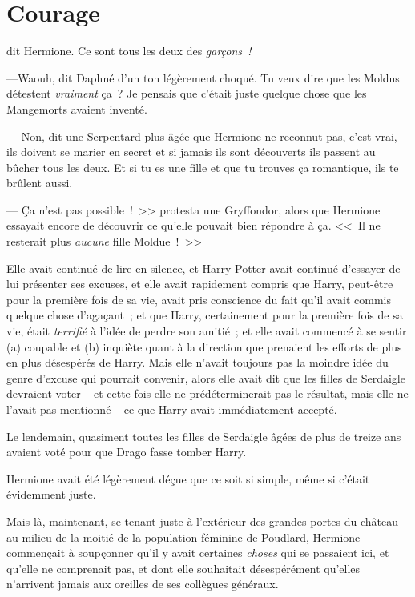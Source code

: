 \chapter{Courage}

 dit Hermione. Ce sont tous les deux des \emph{garçons~!}

\hplettrineextrapara
---Waouh, dit Daphné d'un ton légèrement choqué. Tu veux dire que les Moldus détestent \emph{vraiment} ça~? Je pensais que c'était juste quelque chose que les Mangemorts avaient inventé.

--- Non, dit une Serpentard plus âgée que Hermione ne reconnut pas, c'est vrai, ils doivent se marier en secret et si jamais ils sont découverts ils passent au bûcher tous les deux. Et si tu es une fille et que tu trouves ça romantique, ils te brûlent aussi.

--- Ça n'est pas possible~!~>> protesta une Gryffondor, alors que Hermione essayait encore de découvrir ce qu'elle pouvait bien répondre à ça. <<~Il ne resterait plus \emph{aucune} fille Moldue~!~>>

Elle avait continué de lire en silence, et Harry Potter avait continué d'essayer de lui présenter ses excuses, et elle avait rapidement compris que Harry, peut-être pour la première fois de sa vie, avait pris conscience du fait qu'il avait commis quelque chose d'agaçant~; et que Harry, certainement pour la première fois de sa vie, était \emph{terrifié} à l'idée de perdre son amitié~; et elle avait commencé à se sentir (a) coupable et (b) inquiète quant à la direction que prenaient les efforts de plus en plus désespérés de Harry. Mais elle n'avait toujours pas la moindre idée du genre d'excuse qui pourrait convenir, alors elle avait dit que les filles de Serdaigle devraient voter -- et cette fois elle ne prédéterminerait pas le résultat, mais elle ne l'avait pas mentionné -- ce que Harry avait immédiatement accepté.

Le lendemain, quasiment toutes les filles de Serdaigle âgées de plus de treize ans avaient voté pour que Drago fasse tomber Harry.

Hermione avait été légèrement déçue que ce soit si simple, même si c'était évidemment juste.

Mais là, maintenant, se tenant juste à l'extérieur des grandes portes du château au milieu de la moitié de la population féminine de Poudlard, Hermione commençait à soupçonner qu'il y avait certaines \emph{choses} qui se passaient ici, et qu'elle ne comprenait pas, et dont elle souhaitait désespérément qu'elles n'arrivent jamais aux oreilles de ses collègues généraux.

